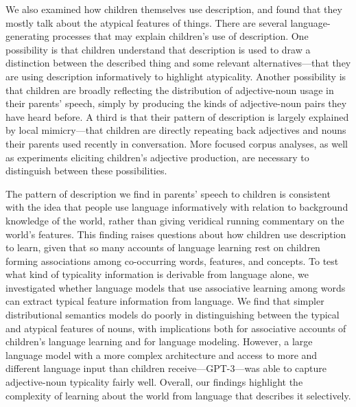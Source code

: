 \documentclass{ucetd}
\begin{document}
We also examined how children themselves use description, and found that
they mostly talk about the atypical features of things. There are
several language-generating processes that may explain children's use of
description. One possibility is that children understand that
description is used to draw a distinction between the described thing
and some relevant alternatives---that they are using description
informatively to highlight atypicality. Another possibility is that
children are broadly reflecting the distribution of adjective-noun usage
in their parents' speech, simply by producing the kinds of
adjective-noun pairs they have heard before. A third is that their
pattern of description is largely explained by local mimicry---that
children are directly repeating back adjectives and nouns their parents
used recently in conversation. More focused corpus analyses, as well as
experiments eliciting children's adjective production, are necessary to
distinguish between these possibilities.

The pattern of description we find in parents' speech to children is
consistent with the idea that people use language informatively with
relation to background knowledge of the world, rather than giving
veridical running commentary on the world's features. This finding
raises questions about how children use description to learn, given that
so many accounts of language learning rest on children forming
associations among co-occurring words, features, and concepts. To test
what kind of typicality information is derivable from language alone, we
investigated whether language models that use associative learning among
words can extract typical feature information from language. We find
that simpler distributional semantics models do poorly in distinguishing
between the typical and atypical features of nouns, with implications
both for associative accounts of children's language learning and for
language modeling. However, a large language model with a more complex
architecture and access to more and different language input than
children receive---GPT-3---was able to capture adjective-noun typicality
fairly well. Overall, our findings highlight the complexity of learning
about the world from language that describes it selectively.
\end{document}

